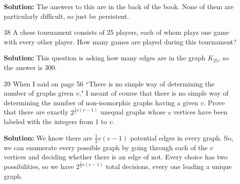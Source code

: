 \documentclass{article}
\begin{document}
\begin{enumerate}
\textbf{Solution:} The answers to this are in the back of the book. None of them are particularly difficult, so just be persistent.

\item[38] A chess tournament consists of 25 players, each of whom plays one game with every other player. How many games are played during this tournament?

\textbf{Solution:} This question is asking how many edges are in the graph $K_{25}$, so the answer is 300.

\item[39] When I said on page 56 ``There is no simple way of determining the number of graphs given $v$," I meant of course that there is no simple way of determining the number of non-isomorphic graphs having a given $v$. Prove that there are exactly $2^{\frac{1}{2}v(v-1)}$ unequal graphs whose $v$ vertices have been labeled with the integers from 1 to $v$.

\textbf{Solution:} We know there are $\frac{1}{2}v(v-1)$ potential edges in every graph. So, we can enumerate every possible graph by going through each of the $v$ vertices and deciding whether there is an edge of not. Every choice has two possibilities, so we have $2^{\frac{1}{2}v(v-1)}$ total decisions, every one leading a unique graph.

\end{enumerate}
\end{document}
